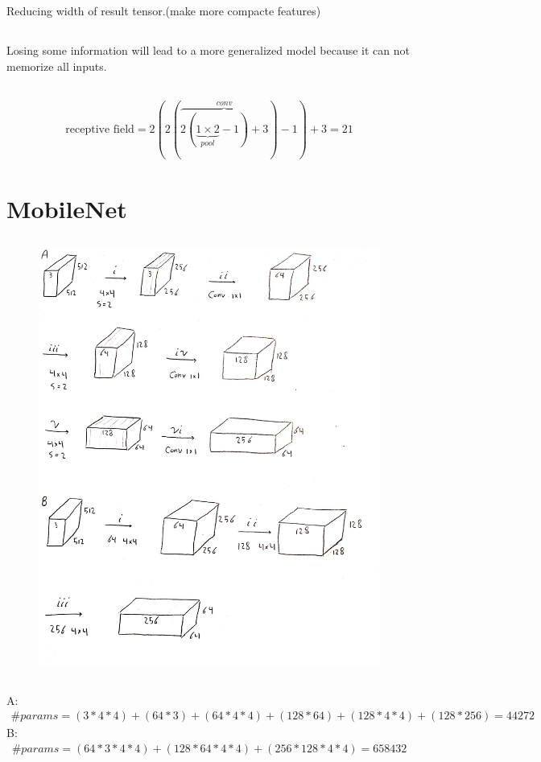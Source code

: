 \documentclass{article}
\begin{document}
\subsection{}
Reducing width of result tensor.(make more compacte features)


\subsection{}
Losing some information will lead to a more generalized model 
because it can not memorize all inputs.

\subsection{}
\begin{align*}
    \text{receptive field} = 2(2(\overbrace{2(\underbrace{1 \times 2}_{pool} - 1) + 3}^{conv}) - 1) + 3 = 21
\end{align*}



\section{MobileNet}


\subsection{}
\begin{figure}[H]
    \centering
    \includegraphics[width=0.5\linewidth]{figures/Q5_1.jpg}
    \label{fig:enter-label}
\end{figure}

\subsection{}
A:
\begin{align*}
    \#params = (3*4*4) + (64*3) + (64*4*4) + (128*64) + (128*4*4) + (128*256) = 44272
\end{align*}
\noindent
B:
\begin{align*}
    \#params = (64*3*4*4) + (128*64*4*4) + (256*128*4*4) = 658432
\end{align*}
\end{document}

